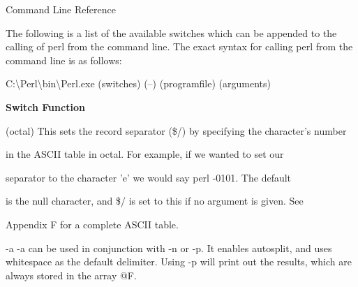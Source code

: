 \documentclass[a4paper,11pt]{book}
\begin{document}

\noindent 

\noindent 

\noindent 

\noindent 

\noindent 

\noindent 

\noindent 

\noindent 

\noindent 

\noindent 

\noindent 

\noindent 

\noindent 

\noindent 

\noindent 

\noindent Command Line Reference

\noindent 

\noindent 

\noindent 

\noindent 

\noindent The following is a list of the available switches which can be appended to the calling of perl from the command line. The exact syntax for calling perl from the command line is as follows:

\noindent 

\noindent 

\noindent C:\textbackslash Perl\textbackslash bin\textbackslash Perl.exe (switches) (--) (programfile) (arguments)

\noindent 

\noindent 

\noindent \textbf{Switch Function}

\noindent 

(octal) This sets the record separator (\$/) by specifying the character's number

\noindent in the ASCII table in octal. For example, if we wanted to set our

\noindent separator to the character 'e' we would say  perl -0101. The default

\noindent is the null character, and \$/ is set to this if no argument is given. See

\noindent Appendix F for a complete ASCII table.

\noindent 

\noindent -a -a can be used in conjunction with -n or -p. It enables autosplit, and uses whitespace as the default delimiter. Using -p will print out the results, which are always stored in the array @F.
\end{document}
